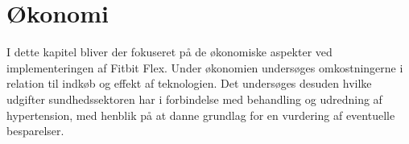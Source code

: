 \chapter{Økonomi}
I dette kapitel bliver der fokuseret på de økonomiske aspekter ved implementeringen af Fitbit Flex. Under økonomien undersøges omkostningerne i relation til indkøb og effekt af teknologien. Det undersøges desuden hvilke udgifter sundhedssektoren har i forbindelse med behandling og udredning af hypertension, med henblik på at danne grundlag for en vurdering af eventuelle besparelser. 